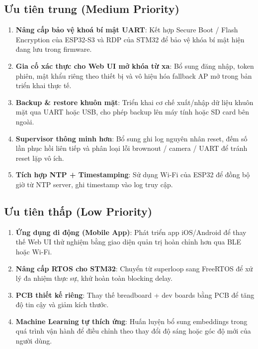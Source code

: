 \subsection{Ưu tiên trung (Medium Priority)}

\begin{enumerate}[label=\arabic*.]
  \item \textbf{Nâng cấp bảo vệ khoá bí mật UART}: Kết hợp Secure Boot / Flash Encryption của ESP32-S3 và RDP của STM32 để bảo vệ khóa bí mật hiện đang lưu trong firmware.
  
  \item \textbf{Gia cố xác thực cho Web UI mở khóa từ xa}: Bổ sung đăng nhập, token phiên, mật khẩu riêng theo thiết bị và vô hiệu hóa fallback AP mở trong bản triển khai thực tế.
  
  \item \textbf{Backup \& restore khuôn mặt}: Triển khai cơ chế xuất/nhập dữ liệu khuôn mặt qua UART hoặc USB, cho phép backup lên máy tính hoặc SD card bên ngoài.
  
  \item \textbf{Supervisor thông minh hơn}: Bổ sung ghi log nguyên nhân reset, đếm số lần phục hồi liên tiếp và phân loại lỗi brownout / camera / UART để tránh reset lặp vô ích.
  
  \item \textbf{Tích hợp NTP + Timestamping}: Sử dụng Wi-Fi của ESP32 để đồng bộ giờ từ NTP server, ghi timestamp vào log truy cập.
\end{enumerate}

\subsection{Ưu tiên thấp (Low Priority)}

\begin{enumerate}[label=\arabic*.]
  \item \textbf{Ứng dụng di động (Mobile App)}: Phát triển app iOS/Android để thay thế Web UI thử nghiệm bằng giao diện quản trị hoàn chỉnh hơn qua BLE hoặc Wi-Fi.
  
  \item \textbf{Nâng cấp RTOS cho STM32}: Chuyển từ superloop sang FreeRTOS để xử lý đa nhiệm thực sự, khử hoàn toàn blocking delay.
  
  \item \textbf{PCB thiết kế riêng}: Thay thế breadboard + dev boards bằng PCB để tăng độ tin cậy và giảm kích thước.
  
  \item \textbf{Machine Learning tự thích ứng}: Huấn luyện bổ sung embeddings trong quá trình vận hành để điều chỉnh theo thay đổi độ sáng hoặc góc độ mới của người dùng.
\end{enumerate}
